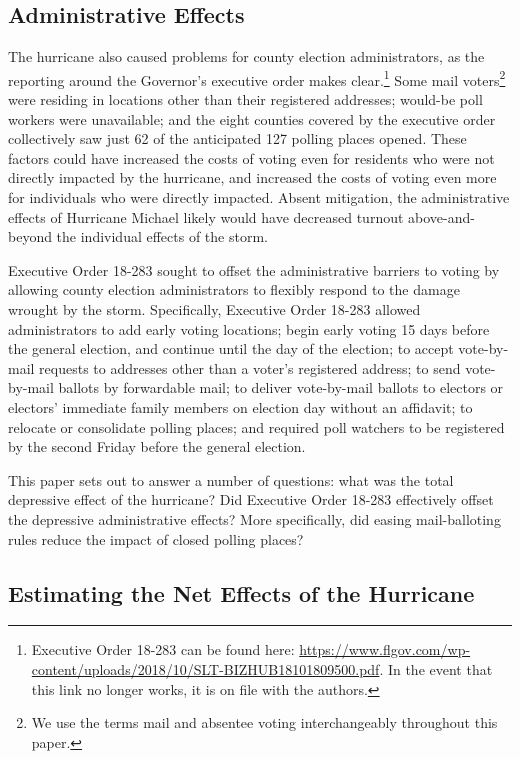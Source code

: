 \documentclass[
  12pt,
]{article}
\begin{document}
\hypertarget{administrative-effects}{%
\subsection*{Administrative Effects}\label{administrative-effects}}

The hurricane also caused problems for county election administrators, as the reporting around the Governor's executive order makes clear.\footnote{Executive Order 18-283 can be found here: \url{https://www.flgov.com/wp-content/uploads/2018/10/SLT-BIZHUB18101809500.pdf}. In the event that this link no longer works, it is on file with the authors.} Some mail voters\footnote{We use the terms mail and absentee voting interchangeably throughout this paper.} were residing in locations other than their registered addresses; would-be poll workers were unavailable; and the eight counties covered by the executive order collectively saw just 62 of the anticipated 127 polling places opened. These factors could have increased the costs of voting even for residents who were not directly impacted by the hurricane, and increased the costs of voting even more for individuals who were directly impacted. Absent mitigation, the administrative effects of Hurricane Michael likely would have decreased turnout above-and-beyond the individual effects of the storm.

Executive Order 18-283 sought to offset the administrative barriers to voting by allowing county election administrators to flexibly respond to the damage wrought by the storm. Specifically, Executive Order 18-283 allowed administrators to add early voting locations; begin early voting 15 days before the general election, and continue until the day of the election; to accept vote-by-mail requests to addresses other than a voter's registered address; to send vote-by-mail ballots by forwardable mail; to deliver vote-by-mail ballots to electors or electors' immediate family members on election day without an affidavit; to relocate or consolidate polling places; and required poll watchers to be registered by the second Friday before the general election.

This paper sets out to answer a number of questions: what was the total depressive effect of the hurricane? Did Executive Order 18-283 effectively offset the depressive administrative effects? More specifically, did easing mail-balloting rules reduce the impact of closed polling places?

\hypertarget{estimating-the-net-effects-of-the-hurricane}{%
\subsection*{Estimating the Net Effects of the Hurricane}\label{estimating-the-net-effects-of-the-hurricane}}
\end{document}
